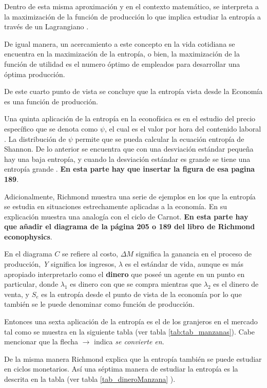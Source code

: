 Dentro de esta misma aproximación y en el contexto matemático, se interpreta a la maximización de la función de producción lo que implica estudiar la entropía a través de un Lagrangiano \citep[][página 205]{richmond} \citep[][página 150]{cottrell_classical_2009}.

De igual manera, un acercamiento a este concepto en la vida cotidiana se encuentra en la maximización  de la entropía, o bien, la maximización de la función de utilidad es el numero óptimo de empleados para desarrollar una óptima producción.

De este cuarto punto de vista se concluye que la entropía vista desde la Economía es una función de producción. 

Una quinta aplicación de la entropía en la econofísica es en el estudio del precio específico que se denota como $\psi$, el cual es el valor por hora del contenido laboral \citep[][]{cottrell_classical_2009}. La distribución de $\psi$ permite que se pueda calcular la ecuación entropía de Shannon. De lo anterior se encuentra que con una desviación estándar pequeña hay una baja entropía, y cuando la desviación estándar es grande se tiene una entropía grande \citep[][pagina 189]{cottrell_classical_2009}. \textbf{En esta parte hay que insertar la figura de esa pagina 189}.

Adicionalmente, Richmond muestra una serie de ejemplos en los que la entropía se estudia en situaciones estrechamente aplicadas a la economía. En su explicación muestra una analogía con el ciclo de Carnot. \textbf{En esta parte hay que añadir el diagrama de la página 205 o 189 del libro de Richmond econophysics}. 


En el diagrama $C$ se refiere al costo, $\Delta M$ significa la ganancia en el proceso de producción,  \textit{Y} significa los ingresos, $\lambda$ es el estándar de vida, aunque es más apropiado interpretarlo como el \textbf{dinero} que poseé un agente en un punto en particular, donde $\lambda_{1}$ es dinero con que se compra mientras que $\lambda_{2}$ es el dinero de venta, y $S_e$ es la entropía desde el punto de vista de la economía por lo que también se le puede denominar como función de producción.

Entonces una sexta aplicación de la entropía es el de los granjeros en el mercado tal como se muestra en la siguiente tabla (ver tabla \ref{tab:tab_manzanas}). Cabe mencionar que la flecha $\rightarrow
$ indica \textit{se convierte en}.  

De la misma manera Richmond explica que la entropía también se puede estudiar en ciclos monetarios. Así una séptima manera de estudiar la entropía es la descrita en la tabla (ver tabla \ref{tab_dineroManzana} ). 

